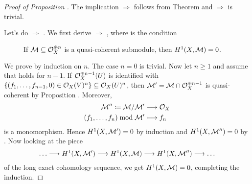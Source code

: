 \documentclass[a4paper,parskip=half,numbers=enddot, DIV=12]{scrreprt}
\renewcommand{\geq}{\geqslant}
\begin{document}
\begin{proof}[Proof of Proposition ]
 The implication  $\Rightarrow$  follows from Theorem  and  $\Rightarrow$  is trivial.

Let's do  $\Rightarrow$ . We first derive  $\Rightarrow$ , where  is the condition
\begin{description}
	\item[] If $\mathcal{M}\subseteq \mathcal{O}_X^{\oplus n}$ is a quasi-coherent submodule, then $H^1(X,\mathcal{M})=0$.
\end{description}
We prove  by induction on $n$. The case $n=0$ is trivial. Now let $n\geq 1$ and assume that  holds for $n-1$. If $\mathcal{O}_X^{\oplus n-1}(U)$ is identified with
$\{(f_1,\ldots,f_{n-1},0) \in \mathcal{O}_X(V)^n\} \subseteq \mathcal{O}_X(U)^n$, then
$\mathcal{M}' = \mathcal{M}\cap \mathcal{O}_X^{\oplus n-1}$ is quasi-coherent by Proposition .
Moreover,
\begin{align*}
	\Mm'' \coloneqq \Mm/\Mm'&\morphism \Oo_X\\
	(f_1,\ldots,f_n)\bmod\Mm'&\longmapsto f_n
\end{align*}
is a monomorphism. Hence $H^1(X,\mathcal{M}')=0$ by induction and $H^1(X,\mathcal{M}'')=0$ by . Now looking at the piece
\begin{align*}
\ldots\morphism H^1(X,\Mm')\morphism H^1(X,\Mm)\morphism H^1(X,\Mm'')\morphism\ldots
\end{align*}
of the long exact cohomology sequence, we get $H^1(X,\mathcal{M})=0$, completing the induction.


\end{proof}
\end{document}
